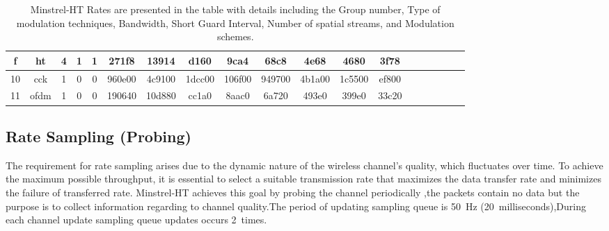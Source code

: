\begin{landscape}
\begin{table}[ht]
\begin{tabular}{||c c c c c c c c c c c c c c c c c c c||}
        \hline
        f & ht & 4 & 1 & 1 & 271f8 & 13914 & d160 & 9ca4 & 68c8 & 4e68 & 4680 & 3f78\\
        \hline
        10 & cck & 1 & 0 & 0 & 960e00 & 4c9100 & 1dcc00 & 106f00 & 949700 & 4b1a00 & 1c5500 & ef800\\
        \hline
        11 & ofdm & 1 & 0 & 0 & 190640 & 10d880 & cc1a0 & 8aac0 & 6a720 & 493e0 & 399e0 & 33c20\\
    \end{tabular}
    \caption[Minstrel-HT Rate Group]{Minstrel-HT Rates are presented in the table with details including the Group number, Type of modulation techniques, Bandwidth, Short Guard Interval, Number of spatial streams, and Modulation schemes.}\label{tab:3b}
  \end{table}  
\end{landscape}








\subsection{Rate Sampling (Probing)}
\label{sec:intro:minstrelht:probing}
The requirement for rate sampling arises due to the dynamic nature of the wireless channel's quality, which fluctuates over time. To achieve the maximum possible throughput, it is essential to select a suitable transmission rate that maximizes the data transfer rate and minimizes the failure of transferred rate. Minstrel-HT achieves this goal by probing the channel periodically ,the packets contain no data but the purpose is to collect information regarding to channel quality.The period of updating sampling queue is 50~Hz (20~milliseconds),During each channel update sampling queue updates occurs 2~times. 

